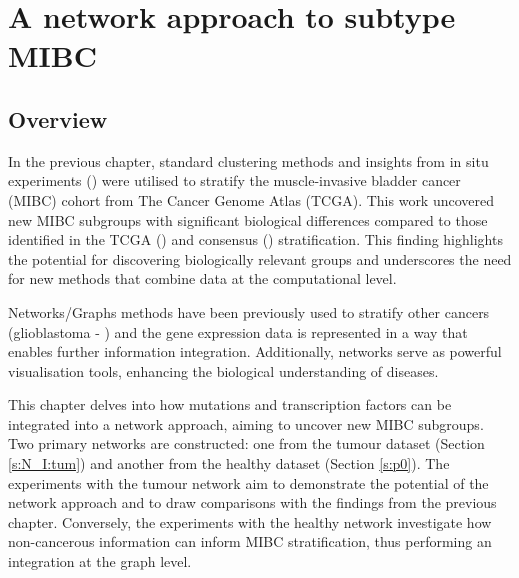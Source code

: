 \section{A network approach to subtype MIBC}


\vspace{3mm}
\vspace{3mm}


\subsection{Overview}

In the previous chapter, standard clustering methods and insights from in situ experiments (\citet{Baker2022-bj}) were utilised to stratify the muscle-invasive bladder cancer (MIBC) cohort from The Cancer Genome Atlas (TCGA). This work uncovered new MIBC subgroups with significant biological differences compared to those identified in the TCGA (\citet{Robertson2017-mg}) and consensus (\citet{Kamoun2020-tj}) stratification. This finding highlights the potential for discovering biologically relevant groups and underscores the need for new methods that combine data at the computational level.

Networks/Graphs methods have been previously used to stratify other cancers (glioblastoma - \citet{Care2019-ij}) and the gene expression data is represented in a way that enables further information integration. Additionally, networks serve as powerful visualisation tools, enhancing the biological understanding of diseases.

This chapter delves into how mutations and transcription factors can be integrated into a network approach, aiming to uncover new MIBC subgroups. Two primary networks are constructed: one from the tumour dataset (Section \ref{s:N_I:tum}) and another from the healthy dataset (Section \ref{s:p0}). The experiments with the tumour network aim to demonstrate the potential of the network approach and to draw comparisons with the findings from the previous chapter. Conversely, the experiments with the healthy network investigate how non-cancerous information can inform MIBC stratification, thus performing an integration at the graph level.

